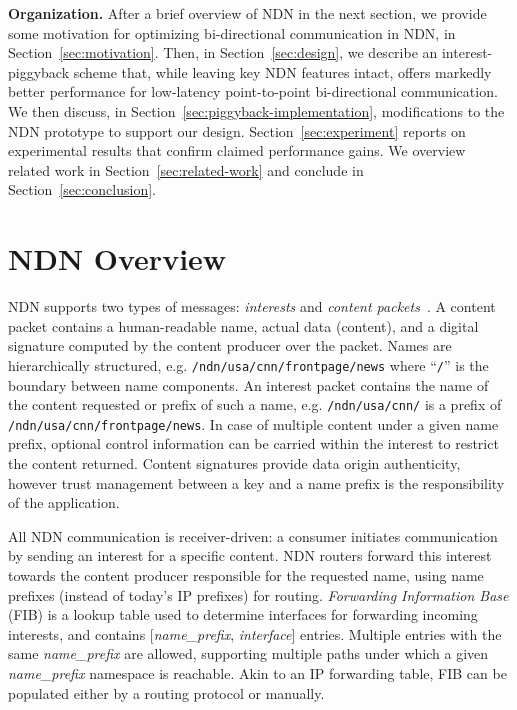 \documentclass[conference]{IEEEtran}
\newcommand{\descr}{\medskip\noindent\textbf}
\renewcommand{\paragraph}{\descr}
\begin{document}
\paragraph{Organization.}
After a brief overview of NDN in the next section, we provide some motivation
for optimizing bi-directional communication in NDN, in Section~\ref{sec:motivation}. 
Then, in Section~\ref{sec:design}, we describe an interest-piggyback scheme that, 
while leaving key NDN features intact, offers markedly better performance for low-latency
point-to-point bi-directional communication.  We then discuss, in 
Section~\ref{sec:piggyback-implementation}, modifications to the NDN prototype 
to support our design. Section~\ref{sec:experiment} reports on experimental results 
that confirm claimed performance gains. We overview related work in Section~\ref{sec:related-work} and conclude in 
Section~\ref{sec:conclusion}.

\section{NDN Overview}
\label{sec:ndn-overview}
NDN supports two types of messages: {\em interests} and {\em content packets}~\cite{ccnx-protocol}. A content packet contains 
a human-readable name, actual data (content), and a digital signature computed by the content producer
over the packet. Names are hierarchically structured, e.g. \verb|/ndn/usa/cnn/frontpage/news| 
where ``\verb|/|'' is the boundary between name components. An interest packet contains the name of 
the content requested or prefix of such a name, e.g. \verb|/ndn/usa/cnn/| is a prefix of 
\verb|/ndn/usa/cnn/frontpage/news|. In case of multiple content under a given name prefix, 
optional control information can be carried within the interest to restrict the content returned. Content
signatures provide data origin authenticity, however trust management between a key
and a name prefix is the responsibility of the application.

All NDN communication is receiver-driven: a consumer initiates communication by sending 
an interest for a specific content. NDN routers forward this interest towards the content producer 
responsible for the requested name, using name prefixes (instead of today's IP prefixes) for
routing. {\em Forwarding Information Base} (FIB) is a lookup table used to determine interfaces 
for forwarding incoming interests, and contains [{\em name\_prefix}, {\em interface}] entries. 
Multiple entries with  the same {\em name\_prefix} are allowed, supporting multiple paths 
under which a given {\em name\_prefix} namespace is reachable. Akin to an IP forwarding table, 
FIB can be populated either by a routing protocol or manually.
\end{document}
